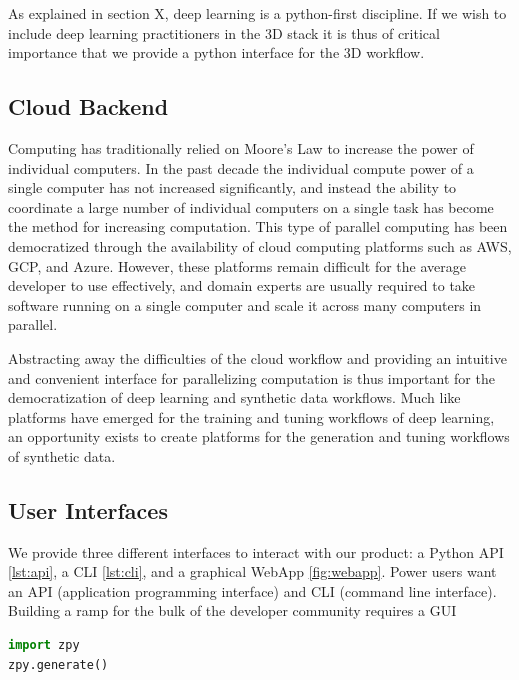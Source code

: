 \documentclass{article}
\begin{document}
As explained in section X, deep learning is a python-first discipline. If we wish to include deep learning practitioners in the 3D stack it is thus of critical importance that we provide a python interface for the 3D workflow.

\subsection{Cloud Backend}
\label{sec:cloudbackend}

Computing has traditionally relied on Moore’s Law to increase the power of individual computers. In the past decade the individual compute power of a single computer has not increased significantly, and instead the ability to coordinate a large number of individual computers on a single task has become the method for increasing computation. This type of parallel computing has been democratized through the availability of cloud computing platforms such as AWS, GCP, and Azure. However, these platforms remain difficult for the average developer to use effectively, and domain experts are usually required to take software running on a single computer and scale it across many computers in parallel.

Abstracting away the difficulties of the cloud workflow and providing an intuitive and convenient interface for parallelizing computation is thus important for the democratization of deep learning and synthetic data workflows. Much like platforms have emerged for the training and tuning workflows of deep learning, an opportunity exists to create platforms for the generation and tuning workflows of synthetic data.

\subsection{User Interfaces}
\label{sec:userinterfaces}

We provide three different interfaces to interact with our product: a Python API \ref{lst:api}, a CLI \ref{lst:cli}, and a graphical WebApp \ref{fig:webapp}. Power users want an API (application programming interface) and CLI (command line interface). Building a ramp for the bulk of the developer community requires a GUI

\begin{lstlisting}[language=Python,caption={Generating a dataset using the zpy python API.},label={lst:api}]
import zpy
zpy.generate()
\end{lstlisting}
\end{document}
